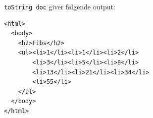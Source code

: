 \documentclass[rgb]{beamer}
\begin{document}
\begin{frame}[fragile]
\begin{footnotesize}


  \vspace{1ex}
  \lstinline{toString doc} giver følgende output:
  \vspace{5mm}

\begin{minipage}{0.8\textwidth}
\begin{verbatim}
<html>
  <body>
    <h2>Fibs</h2>
    <ul><li>1</li><li>1</li><li>2</li>
        <li>3</li><li>5</li><li>8</li>
        <li>13</li><li>21</li><li>34</li>
        <li>55</li>
    </ul>
  </body>
</html>
\end{verbatim}
\end{minipage}\begin{minipage}{0.15\textwidth}

\end{minipage}
\end{footnotesize}
\end{frame}
\end{document}
